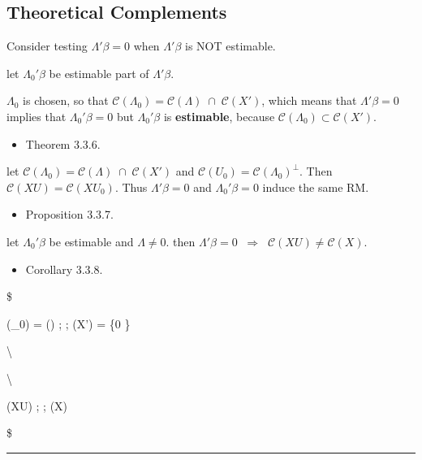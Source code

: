 \documentclass[
]{book}
\providecommand{\tightlist}{%
  \setlength{\itemsep}{0pt}\setlength{\parskip}{0pt}}
\begin{document}
{{{\hypertarget{theoretical-complements}{%
\subsection{Theoretical Complements}\label{theoretical-complements}}

Consider testing \(\Lambda ' \beta = 0\) when \(\Lambda ' \beta\) is NOT estimable.

let \(\Lambda_0 ' \beta\) be estimable part of \(\Lambda ' \beta\).

\(\Lambda_0\) is chosen, so that \(\mathcal{C}(\Lambda_0) = \mathcal{C}(\Lambda) \; \cap \; \mathcal{C}(X')\), which means that \(\Lambda ' \beta = 0\) implies that \(\Lambda_0 ' \beta = 0\) but \(\Lambda_0 ' \beta\) is \textbf{estimable}, because \(\mathcal{C}(\Lambda_0) \subset \mathcal{C}(X')\).

\begin{itemize}
\tightlist
\item
  Theorem 3.3.6.
\end{itemize}

let \(\mathcal{C}(\Lambda_0) = \mathcal{C}(\Lambda) \; \cap \; \mathcal{C}(X')\) and \(\mathcal{C}(U_0) = \mathcal{C}(\Lambda_0)^\perp\). Then \(\mathcal{C}(XU) = \mathcal{C}(XU_0)\). Thus \(\Lambda ' \beta = 0\) and \(\Lambda_0 ' \beta = 0\) induce the same RM.

\begin{itemize}
\tightlist
\item
  Proposition 3.3.7.
\end{itemize}

let \(\Lambda_0 ' \beta\) be estimable and \(\Lambda \not = 0\). then \(\Lambda ' \beta = 0 \; \; \Longrightarrow \; \; \mathcal{C}(XU) \not = \mathcal{C}(X)\).

\begin{itemize}
\tightlist
\item
  Corollary 3.3.8.
\end{itemize}

\$

(\Lambda\_0) = (\Lambda) ; \cap ; (X') = \{0 \}

\textbackslash{}

\Updownarrow

\textbackslash{}

(XU) ; \cap ; (X)

\$

\begin{center}\rule{0.5\linewidth}{0.5pt}\end{center}

}}}
\end{document}
